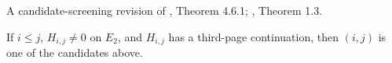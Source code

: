 \begin{theorem}
\label{sem:AdamsCalculations:two-line-d2-screening}
A candidate-screening revision of \cite{Adams60}, Theorem 4.6.1; \cite{LinExt4}, Theorem 1.3.\par

If $i\leq j$, $H_{i,j}\ne0$ on $E_2$, and $H_{i,j}$ has a third-page continuation, then $(i,j)$ is one of the candidates above.
\end{theorem}
